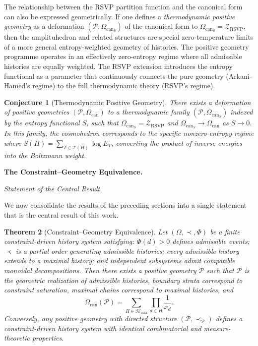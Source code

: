 \documentclass[11pt]{article}
\theoremstyle{plain}
\newtheorem{theorem}{Theorem}[section]
\newtheorem{conjecture}[theorem]{Conjecture}
\theoremstyle{definition}
\theoremstyle{remark}
\newcommand{\Phif}{\Phi}
\newcommand{\Sf}{S}
\newcommand{\OmKS}{\Omega}
\newcommand{\CF}{\Omega_{\mathrm{can}}}
\newcommand{\ZRSVP}{\mathcal{Z}_{\mathrm{RSVP}}}
\newcommand{\Hmax}{\mathcal{H}_{\max}}
\begin{document}
The relationship between the RSVP partition function and the canonical form can also be expressed geometrically. If one defines a \emph{thermodynamic positive geometry} as a deformation $(\mathcal{P}, \CF_{\Sf})$ of the canonical form to $\CF_{\Sf} = \ZRSVP$, then the amplituhedron and related structures are special zero-temperature limits of a more general entropy-weighted geometry of histories. The positive geometry programme operates in an effectively zero-entropy regime where all admissible histories are equally weighted. The RSVP extension introduces the entropy functional as a parameter that continuously connects the pure geometry (Arkani-Hamed's regime) to the full thermodynamic theory (RSVP's regime).

\begin{conjecture}[Thermodynamic Positive Geometry]
There exists a deformation of positive geometries $(\mathcal{P}, \CF)$ to a thermodynamic family $(\mathcal{P}, \CF_{\Sf})$ indexed by the entropy functional $\Sf$, such that $\CF_{\Sf} = \ZRSVP$ and $\CF_{\Sf} \to \CF$ as $\Sf \to 0$. In this family, the cosmohedron corresponds to the specific nonzero-entropy regime where $\Sf(H) = \sum_{T \in \mathcal{T}(H)} \log E_T$, converting the product of inverse energies into the Boltzmann weight.
\end{conjecture}

\bigskip\noindent\textbf{The Constraint--Geometry Equivalence.}
\label{sec:master}

\medskip\noindent\textit{Statement of the Central Result.}

We now consolidate the results of the preceding sections into a single statement that is the central result of this work.

\begin{theorem}[Constraint--Geometry Equivalence]
\label{thm:master}
Let $(\OmKS, \prec, \Phif)$ be a finite constraint-driven history system satisfying: $\Phif(d) > 0$ defines admissible events; $\prec$ is a partial order generating admissible histories; every admissible history extends to a maximal history; and independent subsystems admit compatible monoidal decompositions. Then there exists a positive geometry $\mathcal{P}$ such that $\mathcal{P}$ is the geometric realization of admissible histories, boundary strata correspond to constraint saturation, maximal chains correspond to maximal histories, and
\[
  \CF(\mathcal{P}) = \sum_{H \in \Hmax} \prod_{d \in H} \frac{1}{x_d}.
\]
Conversely, any positive geometry with directed structure $(\mathcal{P}, \prec_{\mathcal{P}})$ defines a constraint-driven history system with identical combinatorial and measure-theoretic properties.
\end{theorem}
\end{document}
